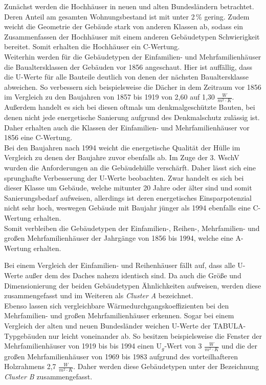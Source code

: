 Zunächst werden die Hochhäuser in neuen und alten Bundesländern betrachtet. 
Deren Anteil am gesamten Wohnungsbestand ist mit unter 2\,\% gering.
Zudem weicht die Geometrie der Gebäude stark von anderen Klassen ab, sodass ein Zusammenfassen der Hochhäuser mit einem anderen Gebäudetypen  Schwierigkeit bereitet.
Somit erhalten die Hochhäuser ein C-Wertung.\\
Weiterhin werden für die Gebäudetypen der Einfamilien- und Mehrfamilienhäuser die Baualtersklassen der Gebäuden vor 1856 angeschaut.
Hier ist auffällig, dass die U-Werte für alle Bauteile deutlich von denen der nächsten Baualtersklasse abweichen.
So verbessern sich beispielsweise die Dächer in dem Zeitraum vor 1856 im Vergleich zu den Baujahren von 1857 bis 1919 von 2,60 auf 1,30 \(\frac{W}{m^2 \cdot K}\).
Außerdem handelt es sich bei diesen oftmals um denkmalgeschützte Bauten, bei denen nicht jede energetische Sanierung aufgrund des Denkmalschutz zulässig ist.
Daher erhalten auch die Klassen der Einfamilien- und Mehrfamilienhäuser vor 1856 eine C-Wertung.\\
Bei den Baujahren nach 1994 weicht die energetische Qualität der Hülle im Vergleich zu denen der Baujahre zuvor ebenfalls ab.
Im Zuge der 3. WschV wurden die Anforderungen an die Gebäudehülle verschärft.
Daher lässt sich eine sprunghafte Verbesserung der U-Werte beobachten.
Zwar handelt es sich bei dieser Klasse um Gebäude, welche mitunter 20 Jahre  oder älter sind und somit Sanierungsbedarf aufweisen, allerdings ist deren energetisches Einsparpotenzial nicht sehr hoch, weswegen Gebäude mit Baujahr jünger als 1994 ebenfalls eine C-Wertung erhalten.\\
Somit verbleiben die Gebäudetypen der Einfamilien-, Reihen-, Mehrfamilien- und großen Mehrfamilienhäuser der Jahrgänge von 1856 bis 1994, welche eine A-Wertung erhalten.

Bei einem Vergleich der Einfamilien- und Reihenhäuser fällt auf, dass alle U-Werte außer dem des Daches nahezu identisch sind.
Da auch die Größe und Dimensionierung der beiden Gebäudetypen Ähnlichkeiten aufweisen, werden diese zusammengefasst und im Weiteren als \textit{Cluster A} bezeichnet.\\
Ebenso lassen sich vergleichbare Wärmedurchgangskoeffizienten bei den Mehrfamilien- und großen Mehrfamilienhäuser erkennen.
Sogar bei einem Vergleich der alten und neuen Bundesländer weichen U-Werte der TABULA-Typgebäuden nur leicht voneinander ab.
So besitzen beispielsweise die Fenster der Mehrfamilienhäuser von 1919 bis bis 1994 einen U\(_g\)-Wert von 3 \(\frac{W}{m^2 \cdot K}\) und die der großen Mehrfamilienhäuser von 1969 bis 1983 aufgrund des vorteilhafteren Holzrahmens 2,7 \(\frac{W}{m^2 \cdot K}\).
Daher werden diese Gebäudetypen unter der Bezeichnung \textit{Cluster B} zusammengefasst.

